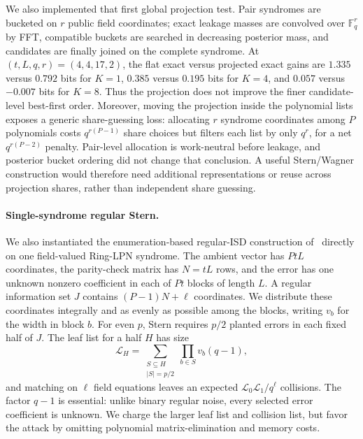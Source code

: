 We also implemented that first global projection test.  Pair syndromes are
bucketed on $r$ public field coordinates; exact leakage masses are convolved
over $\mathbb F_q^r$ by FFT, compatible buckets are searched in decreasing
posterior mass, and candidates are finally joined on the complete syndrome.
At $(t,L,q,r)=(4,4,17,2)$, the flat exact versus projected exact gains are
$1.335$ versus $0.792$ bits for $K=1$, $0.385$ versus $0.195$ bits for $K=4$,
and $0.057$ versus $-0.007$ bits for $K=8$.  Thus the projection does not
improve the finer candidate-level best-first order.  Moreover, moving the
projection inside the polynomial lists exposes a generic share-guessing loss:
allocating $r$ syndrome coordinates among $P$ polynomials costs
$q^{r(P-1)}$ share choices but filters each list by only $q^r$, for a net
$q^{r(P-2)}$ penalty.  Pair-level allocation is work-neutral before leakage,
and posterior bucket ordering did not change that conclusion.  A useful
Stern/Wagner construction would therefore need additional representations or
reuse across projection shares, rather than independent share guessing.

\paragraph{Single-syndrome regular Stern.}
We also instantiated the enumeration-based regular-ISD construction
of~\cite{regularISD} directly on one field-valued Ring-LPN syndrome.  The
ambient vector has $PtL$ coordinates, the parity-check matrix has $N=tL$
rows, and the error has one unknown nonzero coefficient in each of $Pt$
blocks of length $L$.  A regular information set $J$ contains
$(P-1)N+\ell$ coordinates.  We distribute these coordinates integrally and
as evenly as possible among the blocks, writing $v_b$ for the width in block
$b$.  For even $p$, Stern requires $p/2$ planted errors in each fixed half of
$J$.  The leaf list for a half $H$ has size
\[
 \mathcal L_H
 =\sum_{\substack{S\subseteq H\\|S|=p/2}}
   \prod_{b\in S}v_b(q-1),
\]
and matching on $\ell$ field equations leaves an expected
$\mathcal L_0\mathcal L_1/q^\ell$ collisions.  The factor $q-1$ is essential:
unlike binary regular noise, every selected error coefficient is unknown.  We
charge the larger leaf list and collision list, but favor the attack by
omitting polynomial matrix-elimination and memory costs.


